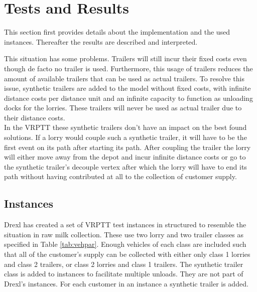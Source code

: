 \section{Tests and Results}
\label{chap:Tests and Results}

This section first provides details about the implementation and the used instances. Thereafter the results are described and interpreted.




This situation has some problems. Trailers will still incur their fixed costs even though de facto no trailer is used. Furthermore, this usage of trailers reduces the amount of available trailers that can be used as actual trailers. To resolve this issue, synthetic trailers are added to the model without fixed costs, with infinite distance costs per distance unit and an infinite capacity to function as unloading docks for the lorries.
These trailers will never be used as actual trailer due to their distance costs.
\\

In the VRPTT these synthetic trailers don't have an impact on the best found solutions.
If a lorry would couple such a synthetic trailer, it will have to be the first event on its path after starting its path.
After coupling the trailer the lorry will either move away from the depot and incur infinite distance costs or go to the synthetic trailer's decouple vertex after which the lorry will have to end its path without having contributed at all to the collection of customer supply.


\subsection{Instances}



Drexl has created a set of VRPTT test instances  in \cite{drexl2014bandc}   structured to resemble the situation in raw milk collection.
These use two lorry and two trailer classes as specified in Table \ref{tab:vehpar}.
Enough vehicles of each class are included such that all of the customer's supply can be collected with either only class 1 lorries and class 2 trailers, or class 2 lorries and class 1 trailers.
The synthetic trailer class is added to instances to facilitate multiple unloads.
They are not part of Drexl's instances.
For each customer in an instance a synthetic trailer is added.
\\

